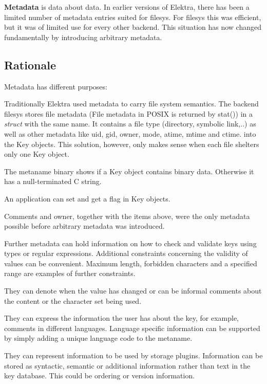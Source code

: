 {\bfseries Metadata} is data about data. In earlier versions of Elektra, there has been a limited number of metadata entries suited for {\ttfamily filesys}. For {\ttfamily filesys} this was efficient, but it was of limited use for every other backend. This situation has now changed fundamentally by introducing arbitrary metadata.

\subsection*{Rationale}

Metadata has different purposes\+:


\begin{DoxyItemize}
\item Traditionally Elektra used metadata to carry file system semantics. The backend {\ttfamily filesys} stores file metadata (File metadata in P\+O\+S\+IX is returned by {\ttfamily stat()}) in a {\itshape struct} with the same name. It contains a file type (directory, symbolic link,..) as well as other metadata like uid, gid, owner, mode, atime, mtime and ctime. into the {\ttfamily Key} objects. This solution, however, only makes sense when each file shelters only one {\ttfamily Key} object.
\item The metaname {\ttfamily binary} shows if a {\ttfamily Key} object contains binary data. Otherwise it has a null-\/terminated C string.
\item An application can set and get a flag in {\ttfamily Key} objects.
\item Comments and owner, together with the items above, were the only metadata possible before arbitrary metadata was introduced.
\item Further metadata can hold information on how to check and validate keys using types or regular expressions. Additional constraints concerning the validity of values can be convenient. Maximum length, forbidden characters and a specified range are examples of further constraints.
\item They can denote when the value has changed or can be informal comments about the content or the character set being used.
\item They can express the information the user has about the key, for example, comments in different languages. Language specific information can be supported by simply adding a unique language code to the metaname.
\item They can represent information to be used by storage plugins. Information can be stored as syntactic, semantic or additional information rather than text in the key database. This could be ordering or version information.

\end{DoxyItemize}
